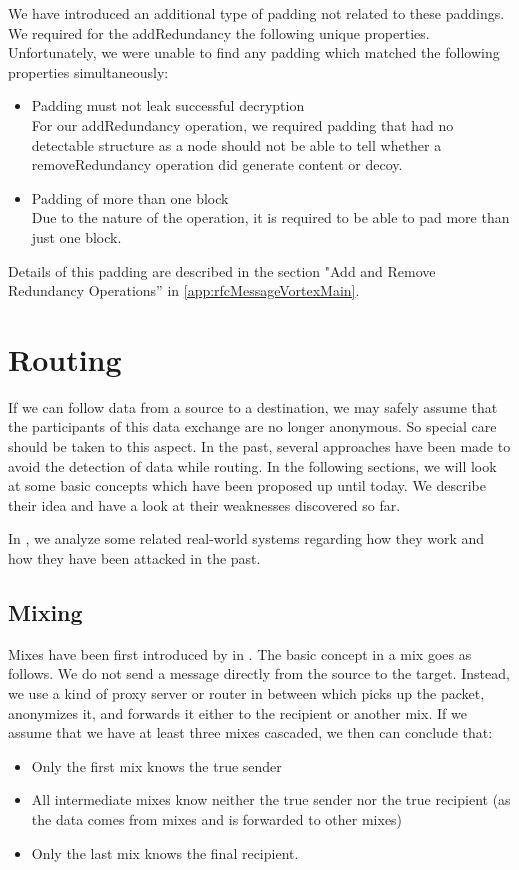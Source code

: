 We have introduced an additional type of padding not related to these paddings. We required for the addRedundancy the following unique properties. Unfortunately, we were unable to find any padding which matched the following properties simultaneously:

\begin{itemize}
	\item Padding must not leak successful decryption\\
	For our addRedundancy operation, we required padding that had no detectable structure as a node should not be able to tell whether a removeRedundancy operation did generate content or decoy. 
	\item Padding of more than one block\\
	Due to the nature of the operation, it is required to be able to pad more than just one block.
\end{itemize}

Details of this padding are described in the section "Add and Remove Redundancy Operations'' in \ref{app:rfcMessageVortexMain}. 

\section{Routing}

If we can follow data from a source to a destination, we may safely assume that the participants of this data exchange are no longer anonymous. So special care should be taken to this aspect. In the past, several approaches have been made to avoid the detection of data while routing. In the following sections, we will look at some basic concepts which have been proposed up until today. We describe their idea and have a look at their weaknesses discovered so far.

In , we analyze some related real-world systems regarding how they work and how they have been attacked in the past.

\subsection{Mixing\label{sec:mixnets}}
Mixes have been first introduced by \cite{CHAUM1} in \citeyear{CHAUM1}. The basic concept in a mix goes as follows. We do not send a message directly from the source to the target. Instead, we use a kind of proxy server or router in between which picks up the packet, anonymizes it, and forwards it either to the recipient or another mix. If we assume that we have at least three mixes cascaded, we then can conclude that:
\begin{itemize}
	\item Only the first mix knows the true sender
	\item All intermediate mixes know neither the true sender nor the true recipient (as the data comes from mixes and is forwarded to other mixes) 
	\item Only the last mix knows the final recipient.
\end{itemize}

